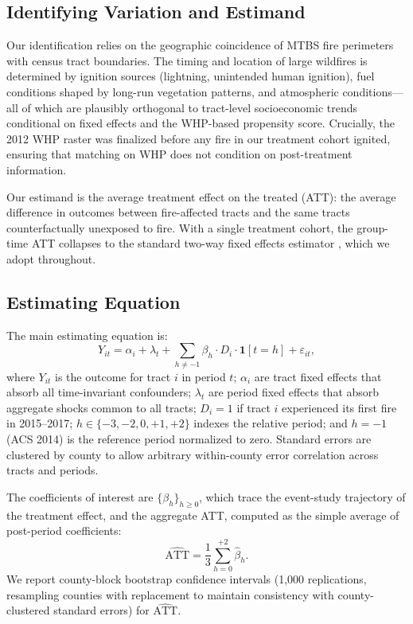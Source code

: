 \documentclass[12pt]{article}
\begin{document}
\subsection{Identifying Variation and Estimand}

Our identification relies on the geographic coincidence of MTBS fire
perimeters with census tract boundaries.
The timing and location of large wildfires is determined by
ignition sources (lightning, unintended human ignition),
fuel conditions shaped by long-run vegetation patterns,
and atmospheric conditions---all of which are plausibly
orthogonal to tract-level socioeconomic trends conditional on
fixed effects and the WHP-based propensity score.
Crucially, the 2012 WHP raster was finalized before any fire in our
treatment cohort ignited, ensuring that matching on WHP does not
condition on post-treatment information.

Our estimand is the average treatment effect on the treated (ATT):
the average difference in outcomes between fire-affected tracts
and the same tracts counterfactually unexposed to fire.
With a single treatment cohort, the \citet{callaway2021difference}
group-time ATT collapses to the standard two-way fixed effects estimator
\citep{goodman2021difference}, which we adopt throughout.

\subsection{Estimating Equation}

The main estimating equation is:
\begin{equation}
  Y_{it} = \alpha_i + \lambda_t
    + \sum_{h \neq -1} \beta_h \cdot D_i \cdot \mathbf{1}[t = h]
    + \varepsilon_{it},
  \label{eq:main}
\end{equation}
where $Y_{it}$ is the outcome for tract $i$ in period $t$;
$\alpha_i$ are tract fixed effects that absorb all time-invariant
confounders;
$\lambda_t$ are period fixed effects that absorb aggregate shocks
common to all tracts;
$D_i = 1$ if tract $i$ experienced its first fire in 2015--2017;
$h \in \{-3, -2, 0, +1, +2\}$ indexes the relative period;
and $h = -1$ (ACS 2014) is the reference period normalized to zero.
Standard errors are clustered by county to allow arbitrary
within-county error correlation across tracts and periods.

The coefficients of interest are $\{\beta_h\}_{h \geq 0}$,
which trace the event-study trajectory of the treatment effect,
and the aggregate ATT, computed as the simple average of post-period
coefficients:
\begin{equation}
  \widehat{\text{ATT}} = \frac{1}{3} \sum_{h=0}^{+2} \hat{\beta}_h.
  \label{eq:att}
\end{equation}
We report county-block bootstrap confidence intervals
(1,000 replications, resampling counties with replacement to maintain
consistency with county-clustered standard errors) for
$\widehat{\text{ATT}}$.
\end{document}
